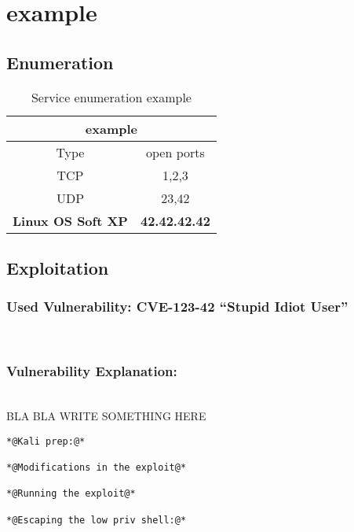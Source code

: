 \renewcommand{\hostname}{example}
\renewcommand{\os}{Linux OS Soft XP}
\renewcommand{\ip}{42.42.42.42}
\renewcommand{\tcpports}{1,2,3}
\renewcommand{\udpports}{23,42}
\renewcommand{\vuln}{CVE-123-42 "`Stupid Idiot User"'}
\toggletrue{priv}

 
\section{\hostname}
\subsection{Enumeration}

	\label{tab:\hostname}
\begin{longtable}{|c|c|}
\caption{Service enumeration \hostname}\\
\hline
\multicolumn{2}{|c|}{\textbf{\hostname}}\\
\hline
\hline
Type&open ports\\
\hline
TCP&\tcpports{}\\
\hline
UDP&\udpports{}\\

\hline
\hline
\multicolumn{1}{|c|}{\textbf{\os}}&\multicolumn{1}{|c|}{\textbf{\ip}}\\
\hline


\end{longtable}
\subsection{Exploitation}

\subsubsection{Used Vulnerability: \vuln}\\

\subsubsection{Vulnerability Explanation:}\\

BLA BLA WRITE SOMETHING HERE 


\begin{lstlisting}[caption={Exploitation of \hostname},label=\hostname-exploit]
*@Kali prep:@*

*@Modifications in the exploit@*

*@Running the exploit@*

*@Escaping the low priv shell:@*
\end{lstlisting}


